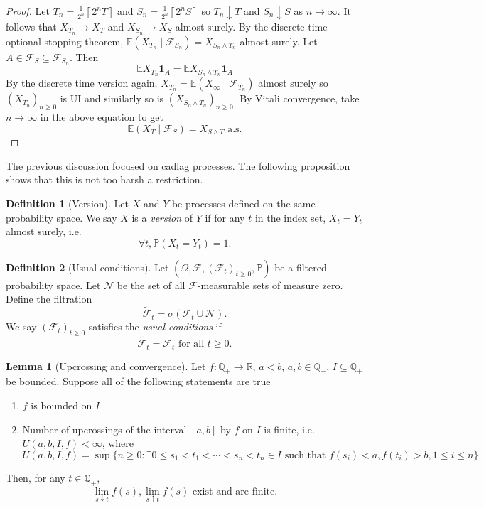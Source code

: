 \documentclass[parskip=full]{article}
\theoremstyle{definition}
\newtheorem*{definition}{Definition}
\newtheorem{lemma}{Lemma}[proposition]
\newcommand{\R}{\mathbb{R}}
\newcommand{\Q}{\mathbb{Q}}
\newcommand{\Pbb}{\mathbb{P}}
\newcommand{\1}{\mathbbm{1}}
\newcommand{\E}{\mathbb{E}}
\providecommand{\ceil}[1]{\left \lceil #1 \right \rceil }
\begin{document}
\begin{proof}
  Let $T_n = \frac{1}{2^n} \ceil{2^n T}$ and $S_n = \frac{1}{2^n} \ceil{2^n S}$ so $T_n \downarrow T$ and $S_n \downarrow S$ as $n \to \infty$. It follows that $X_{T_n} \to X_T$ and $X_{S_n} \to X_S$ almost surely. By the discrete time optional stopping theorem, $\E(X_{T_n} \mid \mathcal{F}_{S_n}) = X_{S_n \wedge T_n}$ almost surely. Let $A \in \mathcal{F}_S \subseteq \mathcal{F}_{S_n}$. Then
  \[
    \E X_{T_n} \mathbf{1}_{A} = \E X_{S_n \wedge T_n} \mathbf{1}_{A}
  \]
  By the discrete time version again, $X_{T_n} = \E(X_\infty \mid \mathcal{F}_{T_n})$ almost surely so $(X_{T_n})_{n \geq 0}$ is UI and similarly so is $(X_{S_n \wedge T_n})_{n \geq 0}$. By Vitali convergence, take $n \to \infty$ in the above equation to get
  \[
    \E(X_T \mid \mathcal{F}_S) = X_{S \wedge T} \text{ a.s.}
  \]
\end{proof}

The previous discussion focused on cadlag processes. The following proposition shows that this is not too harsh a restriction.

\begin{definition}[Version]
  Let $X$ and $Y$ be processes defined on the same probability space. We say $X$ is a \emph{version} of $Y$ if for any $t$ in the index set, $X_t = Y_t$ almost surely, i.e.
  \[
    \forall t, \Pbb(X_t = Y_t) = 1.
  \]  
\end{definition}

\begin{definition}[Usual conditions]
  Let $(\Omega, \mathcal{F}, (\mathcal{F}_t)_{t \geq 0}, \Pbb)$ be a filtered probability space. Let $\mathcal{N}$ be the set of all $\mathcal{F}$-measurable sets of measure zero. Define the filtration
  \[
    \tilde{\mathcal{F}}_t = \sigma(\mathcal{F}_t \cup \mathcal{N}).
  \]
  We say $(\mathcal{F}_t)_{t \geq 0}$ satisfies the \emph{usual conditions} if 
  \[
    \tilde{\mathcal{F}_t} = \mathcal{F}_t \text{ for all } t \geq 0.
  \]
\end{definition}

\begin{lemma}[Upcrossing and convergence]
  Let $f: \Q_+ \to \R$, $a < b$, $a, b \in \Q_+$, $I \subseteq \Q_+$ be bounded. Suppose all of the following statements are true
 \begin{enumerate}
    \item $f$ is bounded on $I$
    \item Number of upcrossings of the interval $[a, b]$ by $f$ on $I$ is finite, i.e. $U(a, b, I, f) < \infty$, where
    \[
      U(a, b, I, f) = \sup \{n \geq 0: \exists 0 \leq s_1 < t_1 < \cdots < s_n < t_n \in I \text{ such that } f(s_i) < a, f(t_i) > b, 1 \leq i \leq n\}
    \]
  \end{enumerate}
  Then, for any $t \in \Q_+$,
  \[
    \lim_{s \downarrow t} f(s), \lim_{s \uparrow t} f(s) \text{ exist and are finite.}
  \]
\end{lemma}
\end{document}
